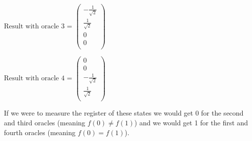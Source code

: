 \noindent\(\text{Result with oracle }3\text{ = }\left(
\begin{array}{c}
 -\frac{1}{\sqrt{2}} \\
 \frac{1}{\sqrt{2}} \\
 0 \\
 0 \\
\end{array}
\right)\)

\noindent\(\text{Result with oracle }4\text{ = }\left(
\begin{array}{c}
 0 \\
 0 \\
 -\frac{1}{\sqrt{2}} \\
 \frac{1}{\sqrt{2}} \\
\end{array}
\right)\)

If we were to measure the register of these states we would get 0 for the second and third oracles (meaning \(f(0) \ne f(1)\)) and we would get 1 for
the first and fourth oracles (meaning \(f(0) = f(1)\)).

